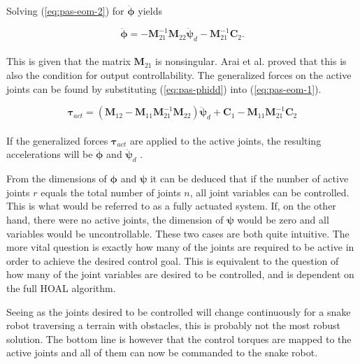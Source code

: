 Solving (\ref{eq:pas-eom-2}) for $\ddot{\boldsymbol{\phi}}$ yields

\begin{equation}\label{eq:pas-phidd}
    \ddot{\boldsymbol{\phi}} = - \mathbf{M}^{-1}_{21}  \mathbf{M}_{22} \ddot{\boldsymbol{\psi}}_d - \mathbf{M}^{-1}_{21} \mathbf{C}_2.
\end{equation}
\\
This is given that the matrix $\mathbf{M}_{21}$ is nonsingular. Arai et al. proved that this is also the condition for output controllability.
The generalized forces on the active joints can be found by substituting (\ref{eq:pas-phidd}) into (\ref{eq:pas-eom-1}).

\begin{equation}\label{eq:tau-act}
    \boldsymbol{\tau}_{act} = (\mathbf{M}_{12} - \mathbf{M}_{11} \mathbf{M}^{-1}_{21} \mathbf{M}_{22})\ddot{\boldsymbol{\psi}}_d + \mathbf{C}_1 - \mathbf{M}_{11} \mathbf{M}^{-1}_{21} \mathbf{C}_2
\end{equation}
\\
If the generalized forces $\boldsymbol{\tau}_{act}$ are applied to the active joints, the resulting accelerations will be $\ddot{\boldsymbol{\phi}}$ and $\ddot{\boldsymbol{\psi}}_d$ \cite{arai1991position}.

From the dimensions of $\boldsymbol{\phi}$ and $\boldsymbol{\psi}$ it can be deduced that if the number of active joints $r$ equals the total number of joints $n$, all joint variables can be controlled. This is what would be referred to as a fully actuated system. If, on the other hand, there were no active joints, the dimension of $\boldsymbol{\psi}$ would be zero and all variables would be uncontrollable. These two cases are both quite intuitive. The more vital question is exactly how many of the joints are required to be active in order to achieve the desired control goal. This is equivalent to the question of how many of the joint variables are desired to be controlled, and is dependent on the full HOAL algorithm.

Seeing as the joints desired to be controlled will change continuously for a snake robot traversing a terrain with obstacles, this is probably not the most robust solution. The bottom line is however that the control torques are mapped to the active joints and all of them can now be commanded to the snake robot.